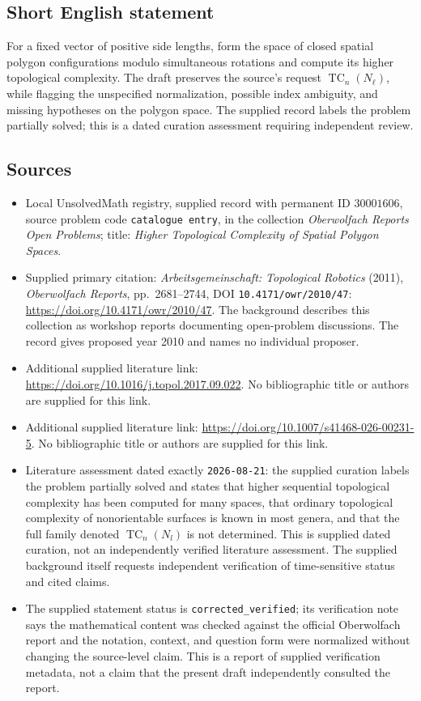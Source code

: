 \documentclass[11pt]{article}
\begin{document}
\subsection{Short English statement}
For a fixed vector of positive side lengths, form the space of closed spatial polygon configurations modulo simultaneous rotations and compute its higher topological complexity. The draft preserves the source's request \(\operatorname{TC}_n(N_\ell)\), while flagging the unspecified normalization, possible index ambiguity, and missing hypotheses on the polygon space. The supplied record labels the problem partially solved; this is a dated curation assessment requiring independent review.
\subsection{Sources}
\begin{itemize}
\item Local UnsolvedMath registry, supplied record with permanent ID \(30001606\), source problem code \texttt{catalogue entry}, in the collection \emph{Oberwolfach Reports Open Problems}; title: \emph{Higher Topological Complexity of Spatial Polygon Spaces}.
\item Supplied primary citation: \emph{Arbeitsgemeinschaft: Topological Robotics} (2011), \emph{Oberwolfach Reports}, pp.\ 2681--2744, DOI \texttt{10.4171/owr/2010/47}: \url{https://doi.org/10.4171/owr/2010/47}. The background describes this collection as workshop reports documenting open-problem discussions. The record gives proposed year 2010 and names no individual proposer.
\item Additional supplied literature link: \url{https://doi.org/10.1016/j.topol.2017.09.022}. No bibliographic title or authors are supplied for this link.
\item Additional supplied literature link: \url{https://doi.org/10.1007/s41468-026-00231-5}. No bibliographic title or authors are supplied for this link.
\item Literature assessment dated exactly \texttt{2026-08-21}: the supplied curation labels the problem partially solved and states that higher sequential topological complexity has been computed for many spaces, that ordinary topological complexity of nonorientable surfaces is known in most genera, and that the full family denoted \(\operatorname{TC}_n(N_l)\) is not determined. This is supplied dated curation, not an independently verified literature assessment. The supplied background itself requests independent verification of time-sensitive status and cited claims.
\item The supplied statement status is \texttt{corrected\_verified}; its verification note says the mathematical content was checked against the official Oberwolfach report and the notation, context, and question form were normalized without changing the source-level claim. This is a report of supplied verification metadata, not a claim that the present draft independently consulted the report.
\end{itemize}
\end{document}
